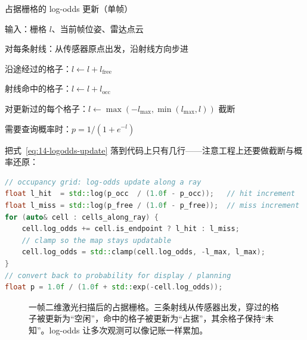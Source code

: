 \begin{pseudo}{占据栅格的 log-odds 更新（单帧）}
  \item 输入：栅格 $l$、当前帧位姿、雷达点云
  \item 对每条射线：从传感器原点出发，沿射线方向步进
  \item 沿途经过的格子：$l\gets l+l_{\mathrm{free}}$
  \item 射线命中的格子：$l\gets l+l_{\mathrm{occ}}$
  \item 对更新过的每个格子：$l\gets\max(-l_{\max},\min(l_{\max},l))$ 截断
  \item 需要查询概率时：$p=1/(1+e^{-l})$
\end{pseudo}

把式~\eqref{eq:14-logodds-update} 落到代码上只有几行——注意工程上还要做截断与概率还原：
\begin{lstlisting}[language=C++]
// occupancy grid: log-odds update along a ray
float l_hit  = std::log(p_occ  / (1.0f - p_occ));   // hit increment
float l_miss = std::log(p_free / (1.0f - p_free));  // miss increment
for (auto& cell : cells_along_ray) {
    cell.log_odds += cell.is_endpoint ? l_hit : l_miss;
    // clamp so the map stays updatable
    cell.log_odds = std::clamp(cell.log_odds, -l_max, l_max);
}
// convert back to probability for display / planning
float p = 1.0f / (1.0f + std::exp(-cell.log_odds));
\end{lstlisting}

\begin{figure}[htbp]
  \centering
  \caption{一帧二维激光扫描后的占据栅格。三条射线从传感器出发，穿过的格子被更新为``空闲''，命中的格子被更新为``占据''，其余格子保持``未知''。log-odds 让多次观测可以像记账一样累加。}\label{fig:14-occupancy}
\end{figure}

